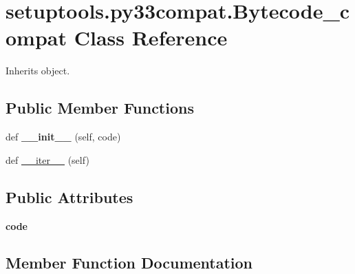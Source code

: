 \hypertarget{classsetuptools_1_1py33compat_1_1_bytecode__compat}{}\section{setuptools.\+py33compat.\+Bytecode\+\_\+compat Class Reference}
\label{classsetuptools_1_1py33compat_1_1_bytecode__compat}


Inherits object.

\subsection*{Public Member Functions}
\begin{DoxyCompactItemize}
\item 
\mbox{\label{classsetuptools_1_1py33compat_1_1_bytecode__compat_a61997ca31cc5321b531f6a707eddc5a4}} 
def {\bfseries \+\_\+\+\_\+init\+\_\+\+\_\+} (self, code)
\item 
def \hyperlink{classsetuptools_1_1py33compat_1_1_bytecode__compat_a7dd9bdf5763dc336450e2c48c43b3aac}{\+\_\+\+\_\+iter\+\_\+\+\_\+} (self)
\end{DoxyCompactItemize}
\subsection*{Public Attributes}
\begin{DoxyCompactItemize}
\item 
\mbox{\label{classsetuptools_1_1py33compat_1_1_bytecode__compat_a9c723390b78a071aafcc9c3d7c6a7428}} 
{\bfseries code}
\end{DoxyCompactItemize}


\subsection{Member Function Documentation}
\mbox{\label{classsetuptools_1_1py33compat_1_1_bytecode__compat_a7dd9bdf5763dc336450e2c48c43b3aac}} 
